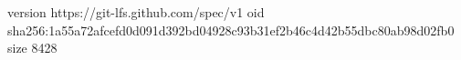 version https://git-lfs.github.com/spec/v1
oid sha256:1a55a72afcefd0d091d392bd04928c93b31ef2b46c4d42b55dbc80ab98d02fb0
size 8428
